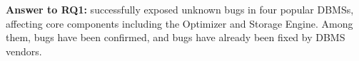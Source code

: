 \documentclass[sigconf,review,anonymous]{acmart}
\begin{document}









\begin{answerbox}
\textbf{Answer to RQ1:} 
\tool{} successfully exposed \bugcnt{} unknown bugs in four popular DBMSs, affecting core components including the Optimizer and Storage Engine. Among them, \bugconfirmcnt{} bugs have been confirmed, and \bugfixcnt{} bugs have already been fixed by DBMS vendors.
\end{answerbox}
\end{document}
